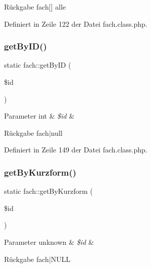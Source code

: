 \begin{DoxyReturn}{Rückgabe}
fach\mbox{[}\mbox{]} alle 
\end{DoxyReturn}


Definiert in Zeile 122 der Datei fach.\+class.\+php.

\mbox{\label{classfach_ad5a2b27a57d355a1ed741cdbf3a9d9e3}} 
\subsubsection{\texorpdfstring{get\+By\+I\+D()}{getByID()}}
{\footnotesize\ttfamily static fach\+::get\+By\+ID (\begin{DoxyParamCaption}\item[{}]{\$id }\end{DoxyParamCaption})\hspace{0.3cm}{\ttfamily [static]}}


\begin{DoxyParams}[1]{Parameter}
int & {\em \$id} & \\
\hline
\end{DoxyParams}
\begin{DoxyReturn}{Rückgabe}
fach$\vert$null 
\end{DoxyReturn}


Definiert in Zeile 149 der Datei fach.\+class.\+php.

\mbox{\label{classfach_ad38e0bd442e74dbcd992846cd04e4bb5}} 
\subsubsection{\texorpdfstring{get\+By\+Kurzform()}{getByKurzform()}}
{\footnotesize\ttfamily static fach\+::get\+By\+Kurzform (\begin{DoxyParamCaption}\item[{}]{\$id }\end{DoxyParamCaption})\hspace{0.3cm}{\ttfamily [static]}}


\begin{DoxyParams}[1]{Parameter}
unknown & {\em \$id} & \\
\hline
\end{DoxyParams}
\begin{DoxyReturn}{Rückgabe}
fach$\vert$\+N\+U\+LL 
\end{DoxyReturn}


